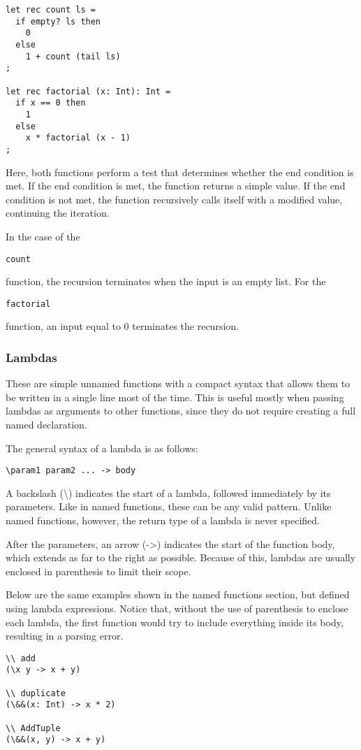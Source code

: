 \documentclass{article}
\def\code#1{\begin{footnotesize}\texttt{#1}\end{footnotesize}}
\begin{document}
\begin{lstlisting}
let rec count ls =
  if empty? ls then
    0
  else
    1 + count (tail ls)
;

let rec factorial (x: Int): Int =
  if x == 0 then
    1
  else
    x * factorial (x - 1)
;
\end{lstlisting}

Here, both functions perform a test that determines whether the end condition is met.
If the end condition is met, the function returns a simple value.
If the end condition is not met, the function recursively calls itself with a modified value, continuing the iteration.

In the case of the \code{count} function, the recursion terminates when the input is an empty list.
For the \code{factorial} function, an input equal to 0 terminates the recursion.

\subsubsection{Lambdas}

These are simple unnamed functions with a compact syntax that allows them to be written in a single line most of the time.
This is useful mostly when passing lambdas as arguments to other functions, since they do not require creating a full named declaration.

The general syntax of a lambda is as follows:

\begin{lstlisting}[escapechar=&]
\param1 param2 ... -> body
\end{lstlisting}

A backslash (\textbackslash) indicates the start of a lambda, followed immediately by its parameters.
Like in named functions, these can be any valid pattern.
Unlike named functions, however, the return type of a lambda is never specified.

After the parameters, an arrow (->) indicates the start of the function body, which extends as far to the right as possible.
Because of this, lambdas are usually enclosed in parenthesis to limit their scope.

Below are the same examples shown in the named functions section, but defined using lambda expressions.
Notice that, without the use of parenthesis to enclose each lambda, the first function would try to include everything inside its body, resulting in a parsing error.

\begin{lstlisting}[escapechar=&]
\\ add
(\x y -> x + y)

\\ duplicate
(\&&(x: Int) -> x * 2)

\\ AddTuple
(\&&(x, y) -> x + y)
\end{lstlisting}
\end{document}
